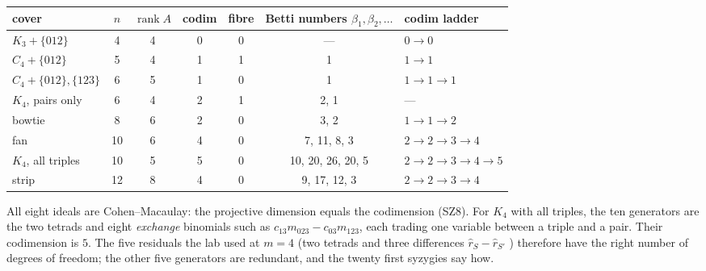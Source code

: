 \documentclass[11pt]{article}
\theoremstyle{definition}\newtheorem{definition}[theorem]{Definition}\newtheorem{remark}[theorem]{Remark}\newtheorem{example}[theorem]{Example}
\begin{document}
\begin{center}\small
\begin{tabular}{lcccccl}\toprule
cover & $n$ & $\operatorname{rank}A$ & codim & fibre & Betti numbers $\beta_1,\beta_2,\dots$ & codim ladder\\\midrule
$K_3+\{012\}$ & 4 & 4 & 0 & 0 & --- & $0\to0$\\
$C_4+\{012\}$ & 5 & 4 & 1 & 1 & 1 & $1\to1$\\
$C_4+\{012\},\{123\}$ & 6 & 5 & 1 & 0 & 1 & $1\to1\to1$\\
$K_4$, pairs only & 6 & 4 & 2 & 1 & 2, 1 & ---\\
bowtie & 8 & 6 & 2 & 0 & 3, 2 & $1\to1\to2$\\
fan & 10 & 6 & 4 & 0 & 7, 11, 8, 3 & $2\to2\to3\to4$\\
$K_4$, all triples & 10 & 5 & 5 & 0 & 10, 20, 26, 20, 5 & $2\to2\to3\to4\to5$\\
strip & 12 & 8 & 4 & 0 & 9, 17, 12, 3 & $2\to2\to3\to4$\\\bottomrule
\end{tabular}
\end{center}
All eight ideals are Cohen--Macaulay: the projective dimension equals the codimension (SZ8). For $K_4$ with all triples, the ten
generators are the two tetrads and eight \emph{exchange} binomials such as $c_{13}m_{023}-c_{03}m_{123}$, each trading one variable between a triple and a pair. Their codimension is $5$. The five residuals the lab used at $m=4$ (two tetrads and three differences
$\hat r_S-\hat r_{S'}$ \cite[Theorem G]{Lab}) therefore have the right number of degrees of freedom; the other five generators are
redundant, and the twenty first syzygies say how.
\end{document}
